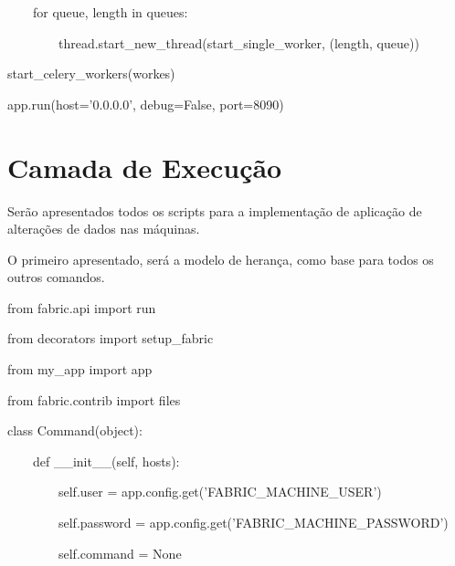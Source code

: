 {\ttfamily\color[rgb]{0.10980392,0.10980392,0.10980392}
    \ \ \ \ for queue, length in queues:}

{\ttfamily\color[rgb]{0.10980392,0.10980392,0.10980392}
    \ \ \ \ \ \ \ \ thread.start\_new\_thread(start\_single\_worker, (length, queue))}


    \bigskip

{\ttfamily\color[rgb]{0.10980392,0.10980392,0.10980392}
    start\_celery\_workers(workes)}

{\ttfamily\color[rgb]{0.10980392,0.10980392,0.10980392}
    app.run(host='0.0.0.0', debug=False, port=8090)}

    \section{Camada de Execu\c{c}\~ao}
{\color{black}
    Ser\~ao apresentados todos os scripts para a implementa\c{c}\~ao de aplica\c{c}\~ao de altera\c{c}\~oes de dados nas
        m\'aquinas.}

{\color{black}
    O primeiro apresentado, ser\'a a modelo de heran\c{c}a, como base para todos os outros comandos.}

{\ttfamily\color[rgb]{0.10980392,0.10980392,0.10980392}
    from fabric.api import run}

{\ttfamily\color[rgb]{0.10980392,0.10980392,0.10980392}
    from decorators import setup\_fabric}

{\ttfamily\color[rgb]{0.10980392,0.10980392,0.10980392}
    from my\_app import app}

{\ttfamily\color[rgb]{0.10980392,0.10980392,0.10980392}
    from fabric.contrib import files}


    \bigskip


    \bigskip

{\ttfamily\color[rgb]{0.10980392,0.10980392,0.10980392}
    class Command(object):}


    \bigskip

{\ttfamily\color[rgb]{0.10980392,0.10980392,0.10980392}
    \ \ \ \ def \_\_init\_\_(self, hosts):}

{\ttfamily\color[rgb]{0.10980392,0.10980392,0.10980392}
    \ \ \ \ \ \ \ \ self.user = app.config.get('FABRIC\_MACHINE\_USER')}

{\ttfamily\color[rgb]{0.10980392,0.10980392,0.10980392}
    \ \ \ \ \ \ \ \ self.password = app.config.get('FABRIC\_MACHINE\_PASSWORD')}

{\ttfamily\color[rgb]{0.10980392,0.10980392,0.10980392}
    \ \ \ \ \ \ \ \ self.command = None}

